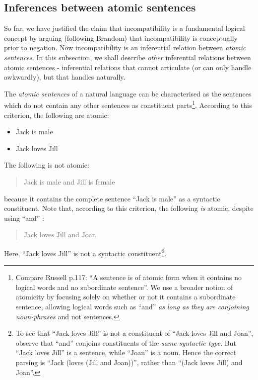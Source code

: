 \subsection{Inferences between atomic sentences}
\label{intrasentential}
So far, we have justified the claim that incompatibility is a fundamental logical concept by arguing (following Brandom) that incompatibility is conceptually prior to negation. 
Now incompatibility is an inferential relation between \emph{atomic sentences}. 
In this subsection, we shall describe \emph{other} inferential relations between atomic sentences - inferential relations that \fol{} cannot articulate (or can only handle awkwardly), but that \cathoristic{} handles naturally.

The \emph{atomic sentences} of a natural language can be
characterised as the sentences which do not contain any other
sentences as constituent parts\footnote{Compare Russell \cite{russell}
  p.117: ``A sentence is of atomic form when it contains no logical
  words and no subordinate sentence''. We use a broader notion of
  atomicity by focusing solely on whether or not it contains a
  subordinate sentence, allowing logical words such as ``and'' \emph{as long
  as they are conjoining noun-phrases} and not sentences.}.  According
to this criterion, the following are atomic:

\begin{itemize}

\item Jack is male
\item Jack loves Jill
\end{itemize}

\NI The following is not atomic:

\begin{quote}
  Jack is male and Jill is female
\end{quote}

\NI because it contains the complete sentence ``Jack is male'' as a
syntactic constituent.  Note that, according to this criterion, the
following \emph{is} atomic, despite using ``and'' :

\begin{quote}
  Jack loves Jill and Joan
\end{quote}

\NI Here, ``Jack loves Jill'' is not a syntactic constituent\footnote{To see that ``Jack loves Jill'' is not a constituent of ``Jack loves Jill and Joan'', observe that ``and'' conjoins constituents of the \emph{same syntactic type}. But ``Jack loves Jill'' is a sentence, while ``Joan'' is a noun. Hence the correct parsing is ``Jack (loves (Jill and Joan))'', rather than ``(Jack loves Jill) and Joan''.}.

